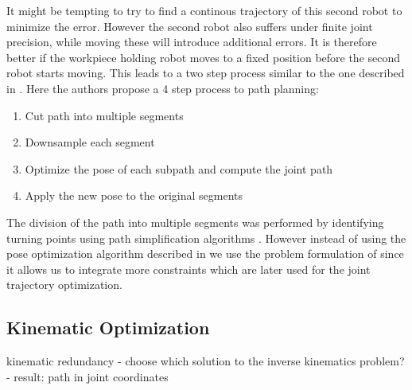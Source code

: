 \documentclass[5p,times,procedia]{elsarticle}
\begin{document}
It might be tempting to try to find a continous trajectory of this second robot to minimize the error.
However the second robot also suffers under finite joint precision, while moving these will introduce additional errors.
It is therefore better if the workpiece holding robot moves to a fixed position before the second robot starts moving.
This leads to a two step process similar to the one described in \cite{stroke_division}.
Here the authors propose a 4 step process to path planning:
\begin{enumerate}
  \item Cut path into multiple segments
  \item Downsample each segment
  \item Optimize the pose of each subpath and compute the joint path
  \item Apply the new pose to the original segments
\end{enumerate}
The division of the path into multiple segments was performed by identifying turning points using path simplification algorithms \cite{stroke_division}.
However instead of using the pose optimization algorithm described in \cite{stroke_division} we use the problem formulation of \cite{previous_work} since it allows us to integrate more constraints which are later used for the joint trajectory optimization.



\subsection{Kinematic Optimization}
kinematic redundancy - choose which solution to the inverse kinematics problem?
- result: path in joint coordinates
\end{document}
